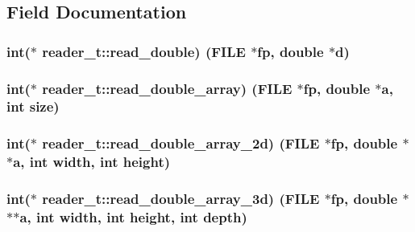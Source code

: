 \subsection{Field Documentation}
\subsubsection[{\texorpdfstring{read\+\_\+double}{read_double}}]{\setlength{\rightskip}{0pt plus 5cm}int($\ast$ reader\+\_\+t\+::read\+\_\+double) (F\+I\+LE $\ast$fp, double $\ast$d)}\hypertarget{structreader__t_ad81ebd5caa6d7f25f33bc6dddf68bc0f}{}\label{structreader__t_ad81ebd5caa6d7f25f33bc6dddf68bc0f}
\subsubsection[{\texorpdfstring{read\+\_\+double\+\_\+array}{read_double_array}}]{\setlength{\rightskip}{0pt plus 5cm}int($\ast$ reader\+\_\+t\+::read\+\_\+double\+\_\+array) (F\+I\+LE $\ast$fp, double $\ast$a, int size)}\hypertarget{structreader__t_a492ae992b1faa462dc7b85972d53a770}{}\label{structreader__t_a492ae992b1faa462dc7b85972d53a770}
\subsubsection[{\texorpdfstring{read\+\_\+double\+\_\+array\+\_\+2d}{read_double_array_2d}}]{\setlength{\rightskip}{0pt plus 5cm}int($\ast$ reader\+\_\+t\+::read\+\_\+double\+\_\+array\+\_\+2d) (F\+I\+LE $\ast$fp, double $\ast$$\ast$a, int width, int height)}\hypertarget{structreader__t_a4b6b3083612b1e7e4a49bd2d468b8f1d}{}\label{structreader__t_a4b6b3083612b1e7e4a49bd2d468b8f1d}
\subsubsection[{\texorpdfstring{read\+\_\+double\+\_\+array\+\_\+3d}{read_double_array_3d}}]{\setlength{\rightskip}{0pt plus 5cm}int($\ast$ reader\+\_\+t\+::read\+\_\+double\+\_\+array\+\_\+3d) (F\+I\+LE $\ast$fp, double $\ast$$\ast$$\ast$a, int width, int height, int depth)}\hypertarget{structreader__t_a9fe018fa8b276a937160e601e3c0b463}{}\label{structreader__t_a9fe018fa8b276a937160e601e3c0b463}
